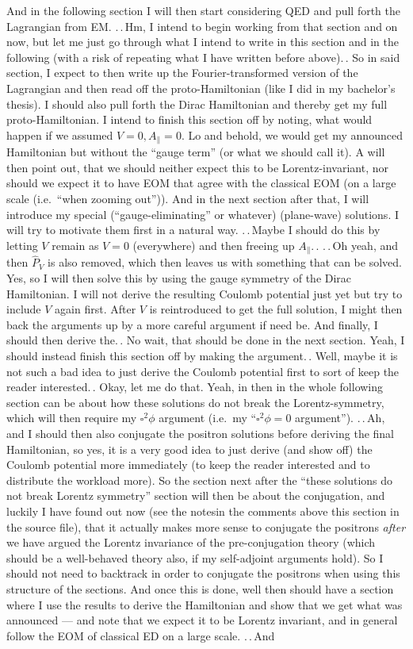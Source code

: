 \documentclass{report}
\begin{document}
And in the following section I will then start considering QED and pull forth the Lagrangian from EM. .\,.\,Hm, I intend to begin working from that section and on now, but let me just go through what I intend to write in this section and in the following (with a risk of repeating what I have written before above).\,. So in said section, I expect to then write up the Fourier-transformed version of the Lagrangian and then read off the proto-Hamiltonian (like I did in my bachelor's thesis). I should also pull forth the Dirac Hamiltonian and thereby get my full proto-Hamiltonian. I intend to finish this section off by noting, what would happen if we assumed $V=0, A_\parallel=0$. Lo and behold, we would get my announced Hamiltonian but without the ``gauge term'' (or what we should call it). A will then point out, that we should neither expect this to be Lorentz-invariant, nor should we expect it to have EOM that agree with the classical EOM (on a large scale (i.e.\ ``when zooming out'')). And in the next section after that, I will introduce my special (``gauge-eliminating'' or whatever) (plane-wave) solutions. I will try to motivate them first in a natural way. .\,.\,Maybe I should do this by letting $V$ remain as $V=0$ (everywhere) and then freeing up $A_\parallel$.\,. .\,.\,Oh yeah, and then $\hat P_V$ is also removed, which then leaves us with something that can be solved. Yes, so I will then solve this by using the gauge symmetry of the Dirac Hamiltonian. I will not derive the resulting Coulomb potential just yet but try to include $V$ again first. After $V$ is reintroduced to get the full solution, I might then back the arguments up by a more careful argument if need be. And finally, I should then derive the.\,. No wait, that should be done in the next section. Yeah, I should instead finish this section off by making the argument.\,. Well, maybe it is not such a bad idea to just derive the Coulomb potential first to sort of keep the reader interested.\,. Okay, let me do that. Yeah, in then in the whole following section can be about how these solutions do not break the Lorentz-symmetry, which will then require my $\square^2 \phi$ argument (i.e.\ my ``$\square^2 \phi = 0$ argument''). .\,.\,Ah, and I should then also conjugate the positron solutions before deriving the final Hamiltonian, so yes, it is a very good idea to just derive (and show off) the Coulomb potential more immediately (to keep the reader interested and to distribute the workload more). So the section next after the ``these solutions do not break Lorentz symmetry'' section will then be about the conjugation, and luckily I have found out now (see the notesin the comments above this section in the source file), that it actually makes more sense to conjugate the positrons \emph{after} we have argued the Lorentz invariance of the pre-conjugation theory (which should be a well-behaved theory also, if my self-adjoint arguments hold). So I should not need to backtrack in order to conjugate the positrons when using this structure of the sections. And once this is done, well then should have a section where I use the results to derive the Hamiltonian and show that we get what was announced --- and note that we expect it to be Lorentz invariant, and in general follow the EOM of classical ED on a large scale. .\,.\,And 
\end{document}
